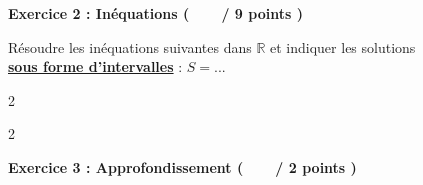 \documentclass[12pt,a4paper]{exam}
\begin{document}
\vspace{0.5cm}

\noindent
\textbf{Exercice 2 : Inéquations (\ \ \ \  / 9 points )}
\vspace{5pt}

\begin{questions}

\question[4] Résoudre les inéquations suivantes dans $\mathbb{R}$ et indiquer les solutions 
\\\textbf{\underline{sous forme d'intervalles}} : $S = ...$
\begin{multicols}{2}
\end{multicols}
\begin{multicols}{2}
\end{multicols}

\end{questions}

\vspace{10pt}

\noindent
\textbf{Exercice 3 : Approfondissement (\ \ \ \  / 2 points )}
\vspace{5pt}
\end{document}
